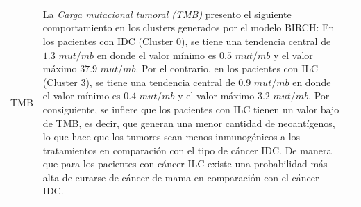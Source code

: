 \begin{table}
	\footnotesize
	\begin{threeparttable}
		\begin{tabular}{p{2.5cm} p{7cm} p{6.5cm}} \toprule
			TMB
			& La \textit{Carga mutacional tumoral (TMB)} presento el siguiente comportamiento en los clusters generados por el modelo BIRCH: En los pacientes con IDC (Cluster 0), se tiene una tendencia central de $1.3$ $mut/mb$ en donde el valor mínimo es $0.5$ $mut/mb$ y el valor máximo $37.9$ $mut/mb$. Por el contrario, en los pacientes con ILC (Cluster 3), se tiene una tendencia central de $0.9$ $mut/mb$ en donde el valor mínimo es $0.4$ $mut/mb$ y el valor máximo $3.2$ $mut/mb$. Por consiguiente, se infiere que los pacientes con ILC tienen un valor bajo de TMB, es decir, que generan una menor cantidad de neoantígenos, lo que hace que los tumores sean menos inmunogénicos a los tratamientos en comparación con el tipo de cáncer IDC. De manera que para los pacientes con cáncer ILC existe una probabilidad más alta de curarse de cáncer de mama en comparación con el cáncer IDC.  
			

\end{tabular}
\end{threeparttable}
\end{table}
